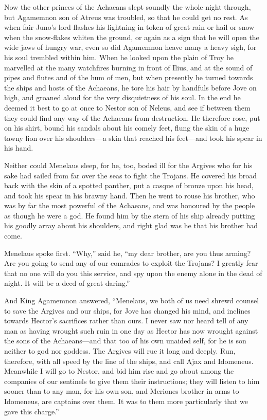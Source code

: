 Now the other princes of the Achaeans slept soundly the whole night
through, but Agamemnon son of Atreus was troubled, so that he could get no
rest. As when fair Juno’s lord flashes his lightning in token of great
rain or hail or snow when the snow-flakes whiten the ground, or again as a
sign that he will open the wide jaws of hungry war, even so did Agamemnon
heave many a heavy sigh, for his soul trembled within him. When he looked
upon the plain of Troy he marvelled at the many watchfires burning in
front of Ilius, and at the sound of pipes and flutes and of the hum of
men, but when presently he turned towards the ships and hosts of the
Achaeans, he tore his hair by handfuls before Jove on high, and groaned
aloud for the very disquietness of his soul. In the end he deemed it best
to go at once to Nestor son of Neleus, and see if between them they could
find any way of the Achaeans from destruction. He therefore rose, put on
his shirt, bound his sandals about his comely feet, flung the skin of a
huge tawny lion over his shoulders—a skin that reached his feet—and
took his spear in his hand.

Neither could Menelaus sleep, for he, too, boded ill for the Argives who
for his sake had sailed from far over the seas to fight the Trojans. He
covered his broad back with the skin of a spotted panther, put a casque of
bronze upon his head, and took his spear in his brawny hand. Then he went
to rouse his brother, who was by far the most powerful of the Achaeans,
and was honoured by the people as though he were a god. He found him by
the stern of his ship already putting his goodly array about his
shoulders, and right glad was he that his brother had come.

Menelaus spoke first. “Why,” said he, “my dear brother, are you thus
arming? Are you going to send any of our comrades to exploit the Trojans?
I greatly fear that no one will do you this service, and spy upon the
enemy alone in the dead of night. It will be a deed of great daring.”

And King Agamemnon answered, “Menelaus, we both of us need shrewd counsel
to save the Argives and our ships, for Jove has changed his mind, and
inclines towards Hector’s sacrifices rather than ours. I never saw nor
heard tell of any man as having wrought such ruin in one day as Hector has
now wrought against the sons of the Achaeans—and that too of his own
unaided self, for he is son neither to god nor goddess. The Argives will
rue it long and deeply. Run, therefore, with all speed by the line of the
ships, and call Ajax and Idomeneus. Meanwhile I will go to Nestor, and bid
him rise and go about among the companies of our sentinels to give them
their instructions; they will listen to him sooner than to any man, for
his own son, and Meriones brother in arms to Idomeneus, are captains over
them. It was to them more particularly that we gave this charge.”

